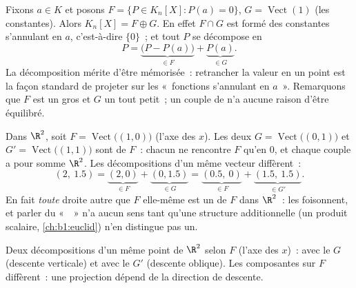 \begin{example}
\label{ex:b1:vspaces:hyperplane}
Fixons $a \in K$ et posons $F = \{P \in K_n[X] : P(a) = 0\}$, $G =
\operatorname{Vect}(1)$ (les constantes). Alors $K_n[X] = F \oplus
G$. En effet $F \cap G$ est formé des constantes s'annulant en $a$,
c'est-à-dire $\{0\}$~; et tout $P$ se décompose en
\[
P = \underbrace{\bigl(P - P(a)\bigr)}_{\in F}
+ \underbrace{P(a)}_{\in G} .
\]
La décomposition mérite d'être mémorisée~: retrancher la valeur en un
point est la façon standard de projeter sur les «~fonctions s'annulant
en $a$~». Remarquons que $F$ est un gros  et $G$ un tout
petit~; un couple de  n'a aucune raison d'être
équilibré.
\end{example}

\begin{example}
\label{ex:b1:vspaces:manysupplements}
Dans $\R^2$, soit $F = \operatorname{Vect}\bigl((1,0)\bigr)$ (l'axe
des $x$). Les deux  $G = \operatorname{Vect}\bigl((0,1)\bigr)$ et
$G' = \operatorname{Vect}\bigl((1,1)\bigr)$ sont  de
$F$~: chacun ne rencontre $F$ qu'en $0$, et chaque couple a pour somme $\R^2$.
Les décompositions d'un même vecteur diffèrent~:
\[
(2,\ 1.5) = \underbrace{(2, 0)}_{\in F} +
\underbrace{(0, 1.5)}_{\in G}
= \underbrace{(0.5,\ 0)}_{\in F} +
\underbrace{(1.5,\ 1.5)}_{\in G'} .
\]
En fait \emph{toute} droite autre que $F$ elle-même est un
 de $F$ dans $\R^2$~: les  foisonnent,
et parler du «~~» n'a aucun sens tant qu'une structure
additionnelle (un produit scalaire, \cref{ch:b1:euclid}) n'en
distingue pas un.
\end{example}

\begin{omfigure}

{\small Deux décompositions d'un même point de $\R^2$ selon $F$
(l'axe des $x$)~: avec le  $G$ (descente verticale) et
avec le  $G'$ (descente oblique). Les composantes sur
$F$ diffèrent~: une projection dépend de la direction de descente.}
\end{omfigure}

